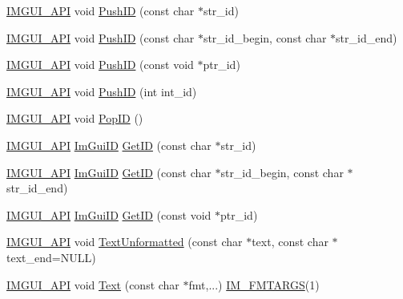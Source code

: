 \begin{DoxyCompactItemize}
\mbox{\hyperlink{imgui_8h_a43829975e84e45d1149597467a14bbf5}{I\+M\+G\+U\+I\+\_\+\+A\+PI}} void \mbox{\hyperlink{namespace_im_gui_a27a8533605dc5b8cabf161bf7715bbde}{Push\+ID}} (const char $\ast$str\+\_\+id)
\item 
\mbox{\hyperlink{imgui_8h_a43829975e84e45d1149597467a14bbf5}{I\+M\+G\+U\+I\+\_\+\+A\+PI}} void \mbox{\hyperlink{namespace_im_gui_af5e55788830807a7c53d5dd7865b692a}{Push\+ID}} (const char $\ast$str\+\_\+id\+\_\+begin, const char $\ast$str\+\_\+id\+\_\+end)
\item 
\mbox{\hyperlink{imgui_8h_a43829975e84e45d1149597467a14bbf5}{I\+M\+G\+U\+I\+\_\+\+A\+PI}} void \mbox{\hyperlink{namespace_im_gui_af9cf42fdf2fbc5eeec7521de14996bfb}{Push\+ID}} (const void $\ast$ptr\+\_\+id)
\item 
\mbox{\hyperlink{imgui_8h_a43829975e84e45d1149597467a14bbf5}{I\+M\+G\+U\+I\+\_\+\+A\+PI}} void \mbox{\hyperlink{namespace_im_gui_a6a11664be2a0b9a0e7054bb339e009ac}{Push\+ID}} (int int\+\_\+id)
\item 
\mbox{\hyperlink{imgui_8h_a43829975e84e45d1149597467a14bbf5}{I\+M\+G\+U\+I\+\_\+\+A\+PI}} void \mbox{\hyperlink{namespace_im_gui_aba0b2d8f890a5d435ae43d0c4a2d4dd1}{Pop\+ID}} ()
\item 
\mbox{\hyperlink{imgui_8h_a43829975e84e45d1149597467a14bbf5}{I\+M\+G\+U\+I\+\_\+\+A\+PI}} \mbox{\hyperlink{imgui_8h_a1785c9b6f4e16406764a85f32582236f}{Im\+Gui\+ID}} \mbox{\hyperlink{namespace_im_gui_a3329b04bd4235e90ad9deb00ffb38ae4}{Get\+ID}} (const char $\ast$str\+\_\+id)
\item 
\mbox{\hyperlink{imgui_8h_a43829975e84e45d1149597467a14bbf5}{I\+M\+G\+U\+I\+\_\+\+A\+PI}} \mbox{\hyperlink{imgui_8h_a1785c9b6f4e16406764a85f32582236f}{Im\+Gui\+ID}} \mbox{\hyperlink{namespace_im_gui_a26064d74efebef3aa86e1a78b3e4c333}{Get\+ID}} (const char $\ast$str\+\_\+id\+\_\+begin, const char $\ast$str\+\_\+id\+\_\+end)
\item 
\mbox{\hyperlink{imgui_8h_a43829975e84e45d1149597467a14bbf5}{I\+M\+G\+U\+I\+\_\+\+A\+PI}} \mbox{\hyperlink{imgui_8h_a1785c9b6f4e16406764a85f32582236f}{Im\+Gui\+ID}} \mbox{\hyperlink{namespace_im_gui_a220123ad62c2180ded92b2ef91f27c5a}{Get\+ID}} (const void $\ast$ptr\+\_\+id)
\item 
\mbox{\hyperlink{imgui_8h_a43829975e84e45d1149597467a14bbf5}{I\+M\+G\+U\+I\+\_\+\+A\+PI}} void \mbox{\hyperlink{namespace_im_gui_a96a5f42789ecc419b2ae8af7b2acc28e}{Text\+Unformatted}} (const char $\ast$text, const char $\ast$text\+\_\+end=N\+U\+LL)
\item 
\mbox{\hyperlink{imgui_8h_a43829975e84e45d1149597467a14bbf5}{I\+M\+G\+U\+I\+\_\+\+A\+PI}} void \mbox{\hyperlink{namespace_im_gui_a9e7b83611fe441d54fad2effb4bf4965}{Text}} (const char $\ast$fmt,...) \mbox{\hyperlink{imgui_8h_a1251c2f9ddac0873dbad8181bd82c9f1}{I\+M\+\_\+\+F\+M\+T\+A\+R\+GS}}(1)

\end{DoxyCompactItemize}
